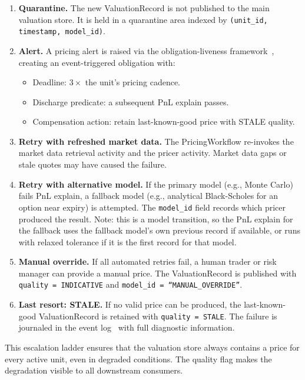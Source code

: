 \documentclass[11pt,a4paper]{article}
\begin{document}
\begin{enumerate}
\item \textbf{Quarantine.}  The new ValuationRecord is not published to the main valuation store.  It is held in a quarantine area indexed by \texttt{(unit\_id, timestamp, model\_id)}.

\item \textbf{Alert.}  A pricing alert is raised via the obligation-liveness framework~\cite[\S14.7]{ledger}, creating an event-triggered obligation with:
\begin{itemize}[nosep]
\item Deadline: $3 \times$ the unit's pricing cadence.
\item Discharge predicate: a subsequent PnL explain passes.
\item Compensation action: retain last-known-good price with STALE quality.
\end{itemize}

\item \textbf{Retry with refreshed market data.}  The PricingWorkflow re-invokes the market data retrieval activity and the pricer activity.  Market data gaps or stale quotes may have caused the failure.

\item \textbf{Retry with alternative model.}  If the primary model (e.g., Monte Carlo) fails PnL explain, a fallback model (e.g., analytical Black-Scholes for an option near expiry) is attempted.  The \texttt{model\_id} field records which pricer produced the result.  Note: this is a model transition, so the PnL explain for the fallback uses the fallback model's own previous record if available, or runs with relaxed tolerance if it is the first record for that model.

\item \textbf{Manual override.}  If all automated retries fail, a human trader or risk manager can provide a manual price.  The ValuationRecord is published with \texttt{quality = INDICATIVE} and \texttt{model\_id = ``MANUAL\_OVERRIDE''}.

\item \textbf{Last resort: STALE.}  If no valid price can be produced, the last-known-good ValuationRecord is retained with \texttt{quality = STALE}.  The failure is journaled in the event log~\cite[\S8.2]{ledger} with full diagnostic information.
\end{enumerate}

\noindent This escalation ladder ensures that the valuation store always contains a price for every active unit, even in degraded conditions.  The quality flag makes the degradation visible to all downstream consumers.
\end{document}

